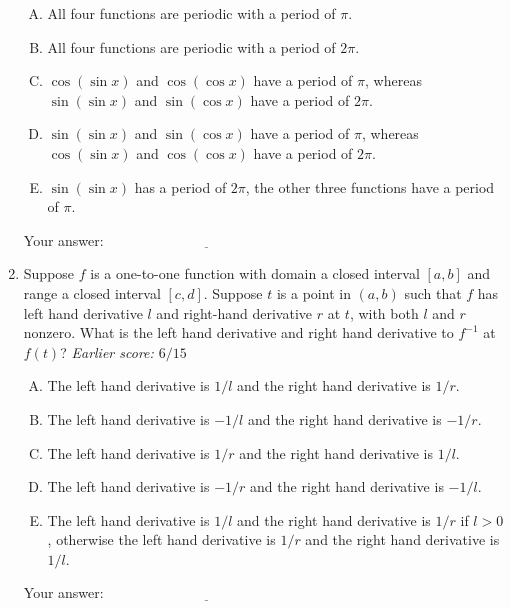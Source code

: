 \documentclass[10pt]{amsart}
\begin{document}
\begin{enumerate}
  \begin{enumerate}[(A)]
  \item All four functions are periodic with a period of $\pi$.
  \item All four functions are periodic with a period of $2\pi$.
  \item $\cos(\sin x)$ and $\cos(\cos x)$ have a period of $\pi$,
    whereas $\sin(\sin x)$ and $\sin(\cos x)$ have a period of $2\pi$.
  \item $\sin(\sin x)$ and $\sin(\cos x)$ have a period of $\pi$,
    whereas $\cos(\sin x)$ and $\cos(\cos x)$ have a period of $2\pi$.
  \item $\sin(\sin x)$ has a period of $2\pi$, the other three
    functions have a period of $\pi$.
  \end{enumerate}
  
  \vspace{0.05in}
  Your answer: $\underline{\qquad\qquad\qquad\qquad\qquad\qquad\qquad}$
  \vspace{0.05in}

\item Suppose $f$ is a one-to-one function with domain a closed
  interval $[a,b]$ and range a closed interval $[c,d]$. Suppose $t$ is
  a point in $(a,b)$ such that $f$ has left hand derivative $l$ and
  right-hand derivative $r$ at $t$, with both $l$ and $r$
  nonzero. What is the left hand derivative and right hand derivative
  to $f^{-1}$ at $f(t)$? {\em Earlier score: $6/15$}

  \begin{enumerate}[(A)]
  \item The left hand derivative is $1/l$ and the right hand
    derivative is $1/r$.
  \item The left hand derivative is $-1/l$ and the right hand
    derivative is $-1/r$.
  \item The left hand derivative is $1/r$ and the right hand
    derivative is $1/l$.
  \item The left hand derivative is $-1/r$ and the right hand
    derivative is $-1/l$.
  \item The left hand derivative is $1/l$ and the right hand
    derivative is $1/r$ if $l > 0$, otherwise the left hand derivative
    is $1/r$ and the right hand derivative is $1/l$.
  \end{enumerate}

  \vspace{0.05in}
  Your answer: $\underline{\qquad\qquad\qquad\qquad\qquad\qquad\qquad}$
  \vspace{0.05in}


\end{enumerate}
\end{document}
